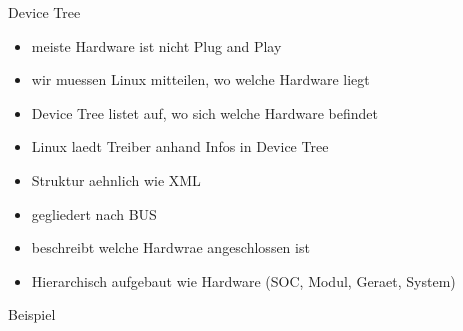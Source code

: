 \begin{frame}{Device Tree}
	\begin{itemize}
		\item meiste Hardware ist nicht Plug and Play
		\item wir muessen Linux mitteilen, wo welche Hardware liegt
		\item Device Tree listet auf, wo sich welche Hardware befindet
		\item Linux laedt Treiber anhand Infos in Device Tree
	\end{itemize}
	\begin{itemize}
		\item Struktur aehnlich wie XML
		\item gegliedert nach BUS
		\item beschreibt welche Hardwrae angeschlossen ist
		\item Hierarchisch aufgebaut wie Hardware (SOC, Modul, Geraet, System)
	\end{itemize}
	Beispiel
\end{frame}
